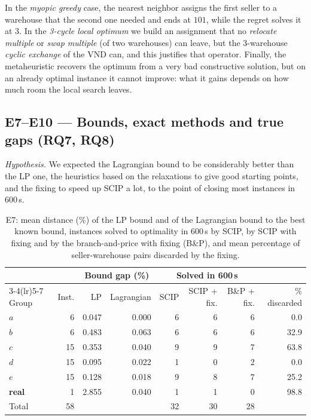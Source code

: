 \documentclass[11pt,a4paper]{article}
\begin{document}
In the \emph{myopic greedy} case, the nearest neighbor assigns the first seller to a warehouse that
the second one needed and ends at $101$, while the regret solves it at $3$. In the \emph{3-cycle
local optimum} we build an assignment that no \emph{relocate multiple} or \emph{swap multiple} (of
two warehouses) can leave, but the 3-warehouse \emph{cyclic exchange} of the VND can, and this
justifies that operator. Finally, the metaheuristic recovers the optimum from a very bad
constructive solution, but on an already optimal instance it cannot improve: what it gains depends
on how much room the local search leaves.

\subsection{E7--E10 --- Bounds, exact methods and true gaps (RQ7, RQ8)}
\emph{Hypothesis.} We expected the Lagrangian bound to be considerably better than the LP one, the
heuristics based on the relaxations to give good starting points, and the fixing to speed up SCIP a
lot, to the point of closing most instances in 600\,s.

\begin{table}[ht]
\centering
\caption{E7: mean distance (\%) of the LP bound and of the Lagrangian bound to the best known
bound, instances solved to optimality in 600\,s by SCIP, by SCIP with fixing and by the
branch-and-price with fixing (B\&P), and mean percentage of seller-warehouse pairs discarded by the
fixing.}
\label{tab:exact}
\small
\begin{tabular}{l r r r r r r r}
\toprule
 & & \multicolumn{2}{c}{Bound gap (\%)} & \multicolumn{3}{c}{Solved in 600\,s} & \\
\cmidrule(lr){3-4}\cmidrule(lr){5-7}
Group & Inst. & LP & Lagrangian & SCIP & SCIP + fix. & B\&P + fix. & \% discarded \\
\midrule
$a$ & 6 & 0.047 & 0.000 & 6 & 6 & 6 & 0.0 \\
$b$ & 6 & 0.483 & 0.063 & 6 & 6 & 6 & 32.9 \\
$c$ & 15 & 0.353 & 0.040 & 9 & 9 & 7 & 63.8 \\
$d$ & 15 & 0.095 & 0.022 & 1 & 0 & 2 & 0.0 \\
$e$ & 15 & 0.128 & 0.018 & 9 & 8 & 7 & 25.2 \\
\textbf{real} & 1 & 2.855 & 0.040 & 1 & 1 & 0 & 98.8 \\
\midrule
Total & 58 & & & 32 & 30 & 28 & \\
\bottomrule
\end{tabular}
\end{table}
\end{document}
